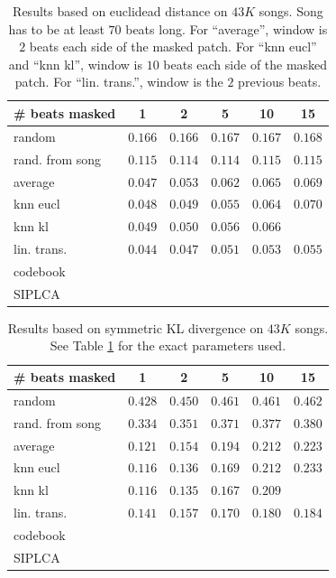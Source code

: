 \documentclass{article}
\begin{document}
\begin{table}[t]
\begin{center}
\begin{tabular}{l|c|c|c|c|c|}
\# beats masked & 1 & 2 & 5 & 10 & 15 \\ \hline \hline
random & $0.166$ & $0.166$ & $0.167$ & $0.167$ & $0.168$  \\
rand. from song & $0.115$ & $0.114$ & $0.114$ & $0.115$ & $0.115$  \\
average & $0.047$ & $0.053$ & $0.062$ & $0.065$ & $0.069$ \\
knn eucl & $0.048$ & $0.049$ & $0.055$ & $0.064$ &  $0.070$ \\
knn kl & $0.049$ & $0.050$ & $0.056$ & $0.066$ &  \\
lin. trans. & $\mathbf{0.044}$ & $\mathbf{0.047}$ & $\mathbf{0.051}$ & $\mathbf{0.053}$ & $\mathbf{0.055}$ \\
codebook & & & & &  \\
SIPLCA & & & & &  \\ \hline
\end{tabular}
\caption{Results based on euclidead distance on $43K$ songs.
Song has to be at least $70$ beats long. 
For ``average'', window is $2$ beats each side of the masked patch.
For ``knn eucl'' and ``knn kl'', window is $10$ beats each side of the masked patch.
For ``lin. trans.'', window is the $2$ previous beats.}
\label{tab:reseucl}
\end{center}
\end{table}

\begin{table}[t]
\begin{center}
\begin{tabular}{l|c|c|c|c|c|}
\# beats masked & 1 & 2 & 5 & 10 & 15 \\ \hline \hline
random & $0.428$ & $0.450$ & $0.461$ & $0.461$ & $0.462$  \\
rand. from song & $0.334$ & $0.351$ & $0.371$ & $0.377$ & $0.380$  \\
average & $0.121$ & $0.154$ & $0.194$ & $0.212$ &  $0.223$ \\
knn eucl & $\mathbf{0.116}$ & $0.136$ & $0.169$ & $0.212$ & $0.233$ \\
knn kl & $\mathbf{0.116}$ & $\mathbf{0.135}$ & $\mathbf{0.167}$ & $0.209$ &  \\
lin. trans. & $0.141$ & $0.157$ & $0.170$ & $\mathbf{0.180}$ & $0.184$ \\
codebook & & & & &  \\
SIPLCA & & & & &  \\ \hline
\end{tabular}
\caption{Results based on symmetric KL divergence on $43K$ songs.
See Table \ref{tab:reseucl} for the exact parameters used.}
\label{tab:reskl}
\end{center}
\end{table}
\end{document}
